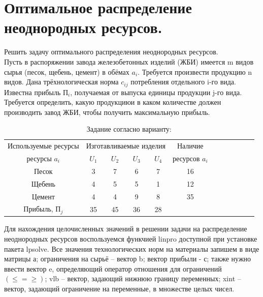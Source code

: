 \documentclass[russian,utf8,nocolumnxxxi,nocolumnxxxii]{eskdtext}
\begin{document}
\newpage

\section{Оптимальное распределение неоднородных ресурсов.}


Решить задачу оптимального распределения неоднородных ресурсов. \\


Пусть в распоряжении завода железобетонных изделий (ЖБИ) имеется m видов сырья (песок, щебень, цемент) в обёмах $a_i$. Требуется произвести продукцию n видов. Дана трёхнологическая норма $c_{ij}$ потребления отдельного i-го вида. Известна прибыль $П_i$, получаемая от выпуска единицы продукции j-го вида. Требуется определить, какую продукциюи  в каком количестве должен производить завод ЖБИ, чтобы получить максимальную прибыль.

\begin{table}[h]

\caption{\label{1} Задание согласно варианту:  }
\renewcommand{\tabcolsep}{0.5cm}
\begin{center}
\begin{tabular}{|c|c|c|c|c|c|c|c|c|c|c|c|}
\hline 
Используемые ресурсы &\multicolumn{4}{|c|}{Изготавливаемые изделия} & Наличие\\
ресурсы $a_i$ & $U_1$ & $U_2$ & $U_3$ & $U_4$ & ресурсов $a_i$\\

\hline
  Песок          & 3  & 7  & 6  & 7  & 16  \\
  Щебень         & 4  & 5  & 5  & 1  & 12  \\
  Цемент         & 4  & 4  & 9  & 8  & 35  \\
  Прибыль, П$_j$ & 35 & 45 & 36 & 28 &   \\
 \hline
\end{tabular}
\end{center}
\end{table} 

 Для нахождения целочисленных значений в решении задачи на распределение неоднородных ресурсов воспользуемся функчией linpro доступной при установке пакета  lpsolve.
Все значения технологических норм на материалы запишем в виде матрицы а;
ограничения на сырьё -- вектор b;  вектор прибыли - с; также нужно ввести
вектор e, определяющий оператор отношения для ограничений $(\leq  =  \geq)$;
vlb – вектор, задающий нижнюю границу переменных;
xint – вектор, задающий ограничение на переменные, в множестве целых чисел.
\end{document}
